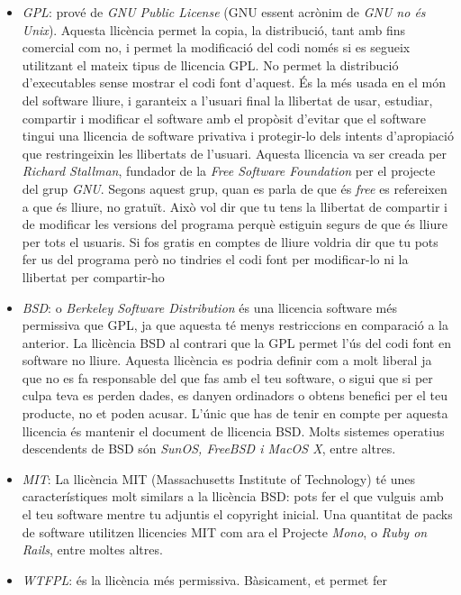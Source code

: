 \begin{itemize}
	\item \emph{GPL}: prové de \emph{GNU Public License} (GNU essent acrònim de
	\emph{GNU no és Unix}). Aquesta 
	llicència permet la copia, la distribució, tant amb fins comercial com no, i 
	permet la modificació del codi només si es segueix utilitzant el mateix 
	tipus de llicencia GPL. No permet la distribució d'executables sense mostrar 
	el codi font d'aquest. És la més usada en el món del 
	software lliure, i garanteix a l'usuari final la llibertat de usar, estudiar, compartir 
	i modificar el software amb el propòsit d'evitar que el software tingui una 
	llicencia de software privativa i protegir-lo dels intents d'apropiació que 
	restringeixin les llibertats de l'usuari. Aquesta llicencia va ser creada per
	\emph{Richard Stallman}, fundador de la \emph{Free Software Foundation}
	per el projecte del grup \emph{GNU}.
	Segons aquest grup, quan es parla de que és \textit{free} es refereixen a que és 
	lliure, no gratuït. Això vol dir que tu tens la llibertat de compartir i de modificar 
	les versions del programa perquè estiguin segurs	de que és lliure per tots el 
	usuaris. Si fos gratis en comptes de lliure voldria dir que tu pots fer us del 
	programa però no tindries el codi font per modificar-lo ni la llibertat per compartir-ho \cite {gnugpl} \cite {tldr}
	\item \emph{BSD}: o \emph{Berkeley Software Distribution} és una llicencia software més 
	permissiva que GPL, ja que aquesta té menys restriccions en comparació a la 
	anterior. La llicència BSD al contrari 
	que la GPL permet l'ús del codi font en software no lliure. Aquesta llicència 
	es podria definir com a molt liberal ja que no es fa responsable del que fas 
	amb el teu software, o sigui que si per culpa teva es perden dades, es danyen 
	ordinadors o obtens benefici per el teu producte, no et poden acusar. L'únic 
	que has de tenir en compte per aquesta llicencia és mantenir el document de 
	llicencia BSD. Molts sistemes operatius descendents de BSD són \emph{SunOS, 
	FreeBSD i MacOS X}, entre altres. \cite {bsd} \cite {tldr}
	\item \emph{MIT}: La llicència MIT (Massachusetts Institute of Technology)
	té unes característiques molt similars a la llicència BSD:
	pots fer el que vulguis amb el teu software mentre tu adjuntis el copyright 
	inicial. Una quantitat de packs de software utilitzen llicencies MIT com ara el
	Projecte \emph{Mono}, o \emph{Ruby on Rails}, entre moltes altres.\cite {mit} \cite {tldr}
	\item \emph{WTFPL}: és la llicència més permissiva. Bàsicament, et permet fer

\end{itemize}
